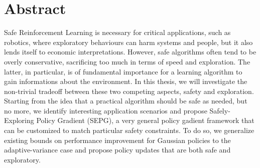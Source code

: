 \chapter*{Abstract}

Safe Reinforcement Learning is necessary for critical applications, such as robotics, where exploratory behaviours can harm systems and people, but it also lends itself to economic interpretations. However, safe algorithms often tend to be overly conservative, sacrificing too much in terms of speed and exploration. The latter, in particular, is of fundamental importance for a learning algorithm to gain informations about the environment. In this thesis, we will investigate the non-trivial tradeoff between these two competing aspects, safety and exploration. 
Starting from the idea that a practical algorithm should be safe as needed, but no more, we identify interesting application scenarios and propose Safely-Exploring Policy Gradient (SEPG), a very general policy gadient framework that can be customized to match particular safety constraints. To do so, we generalize existing bounds on performance improvement for Gaussian policies to the adaptive-variance case and propose policy updates that are both safe and exploratory. 
